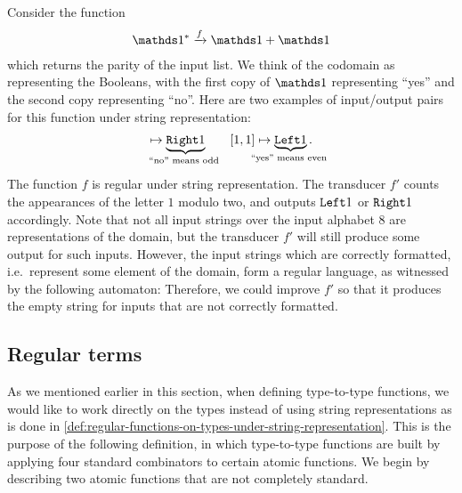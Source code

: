 \begin{myexample}
    Consider the function 
    \begin{align*}
    \onetype^* \xrightarrow f \onetype + \onetype
    \end{align*}
    which returns the parity of the input list. We think of the codomain as representing the Booleans, with the first copy of $\onetype$ representing ``yes'' and the second copy representing ``no''. Here are two examples of input/output pairs for this function under string representation:
    \begin{align*}
    [\onelement,\onelement,\onelement] \mapsto \myunderbrace{\rightterm\onelement}{``no'' means odd} \qquad [\onelement,\onelement] \mapsto \myunderbrace{\leftterm\onelement}{``yes'' means even}.
    \end{align*}
    The function $f$ is regular under string representation. The transducer $f'$ counts the appearances of the letter $1$ modulo two, and outputs $\mathtt{Left}1$ or $\mathtt{Right}1$ accordingly. Note that not all input strings over the input alphabet $8$ are representations of the domain, but the transducer $f'$ will still produce some output  for such inputs. However, the input strings which are correctly formatted, i.e.~represent some element of the domain, form a regular language, as witnessed by the following automaton:
Therefore, we could improve $f'$ so that it produces the empty string for inputs that are not correctly formatted.
\end{myexample}


\subsection{Regular terms}
\label{sec:regular-terms}
As we mentioned earlier in this section, when defining type-to-type functions, we would like to work directly on the types instead of using string representations as is done in \cref{def:regular-functions-on-types-under-string-representation}. This is the purpose of the following definition, in which type-to-type functions are built by applying four standard combinators to certain atomic functions. We begin by describing two atomic functions that are not completely standard. 

